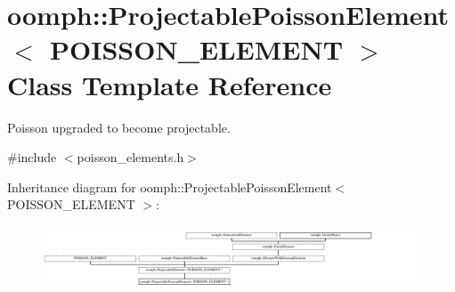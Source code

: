 \hypertarget{classoomph_1_1ProjectablePoissonElement}{}\section{oomph\+:\+:Projectable\+Poisson\+Element$<$ P\+O\+I\+S\+S\+O\+N\+\_\+\+E\+L\+E\+M\+E\+NT $>$ Class Template Reference}
\label{classoomph_1_1ProjectablePoissonElement}


Poisson upgraded to become projectable.  




{\ttfamily \#include $<$poisson\+\_\+elements.\+h$>$}

Inheritance diagram for oomph\+:\+:Projectable\+Poisson\+Element$<$ P\+O\+I\+S\+S\+O\+N\+\_\+\+E\+L\+E\+M\+E\+NT $>$\+:\begin{figure}[H]
\begin{center}
\leavevmode
\includegraphics[height=1.944444cm]{classoomph_1_1ProjectablePoissonElement}
\end{center}
\end{figure}
